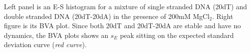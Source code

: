 \label{fig:bva_static}  Left panel is an E-S histogram for a mixture of single stranded DNA (20dT) and double stranded DNA (20dT-20dA) in the presence of 200mM MgCl$_2$. Right figure is its BVA plot. Since both 20dT and 20dT-20dA are stable and have no dynamics, the BVA plots shows an $s_E$ peak sitting on the expected standard deviation curve (\textit{red curve}).